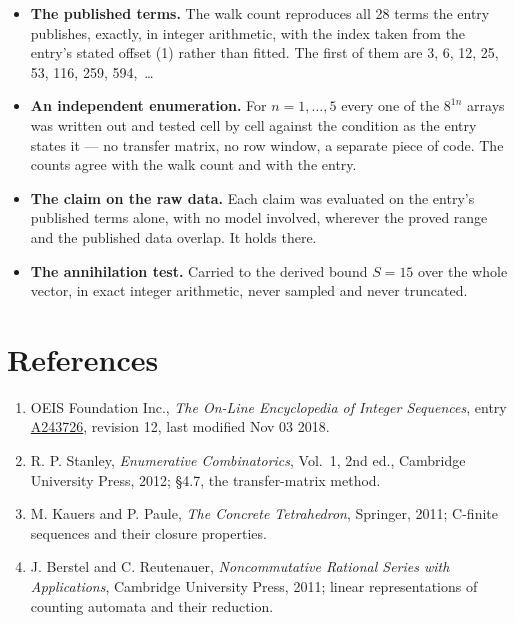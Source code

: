 \documentclass[11pt]{article}
\theoremstyle{definition}
\begin{document}
\begin{itemize}

\item {\bfseries The published terms.} The walk count reproduces all 28 terms the entry publishes, exactly, in integer arithmetic, with the index taken from the entry's stated offset (1) rather than fitted. The first of them are 3, 6, 12, 25, 53, 116, 259, 594,~\dots

\item {\bfseries An independent enumeration.} For $n = 1,\dots,5$ every one of the $8^{1n}$ arrays was written out and tested cell by cell against the condition as the entry states it --- no transfer matrix, no row window, a separate piece of code. The counts agree with the walk count and with the entry.

\item {\bfseries The claim on the raw data.} Each claim was evaluated on the entry's published terms alone, with no model involved, wherever the proved range and the published data overlap. It holds there.

\item {\bfseries The annihilation test.} Carried to the derived bound $S = 15$ over the whole vector, in exact integer arithmetic, never sampled and never truncated.

\end{itemize}

\section{References}

\begin{enumerate}

\item OEIS Foundation Inc., \emph{The On-Line Encyclopedia of Integer Sequences}, entry \href{https://oeis.org/A243726}{A243726}, revision 12, last modified Nov 03 2018.

\item R. P. Stanley, \emph{Enumerative Combinatorics}, Vol.~1, 2nd ed., Cambridge University Press, 2012; \S4.7, the transfer-matrix method.

\item M. Kauers and P. Paule, \emph{The Concrete Tetrahedron}, Springer, 2011; C-finite sequences and their closure properties.

\item J. Berstel and C. Reutenauer, \emph{Noncommutative Rational Series with Applications}, Cambridge University Press, 2011; linear representations of counting automata and their reduction.

\end{enumerate}
\end{document}

